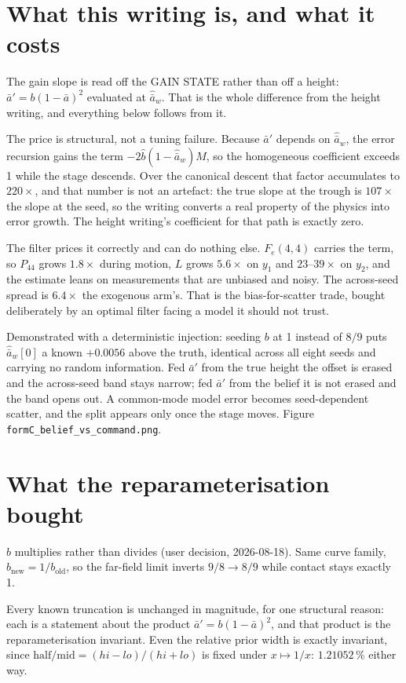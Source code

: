\documentclass[11pt,a4paper,fontset=none]{ctexart}
\newcommand{\ba}{\bar{a}}
\begin{document}
\section*{What this writing is, and what it costs}

The gain slope is read off the GAIN STATE rather than off a height:
$\ba' = b(1-\ba)^{2}$ evaluated at $\hat{\ba}_w$. That is the whole difference
from the height writing, and everything below follows from it.

The price is structural, not a tuning failure. Because $\ba'$ depends on
$\hat{\ba}_w$, the error recursion gains the term $-2\hat{b}(1-\hat{\ba}_w)M$,
so the homogeneous coefficient exceeds 1 while the stage descends. Over the
canonical descent that factor accumulates to $220\times$, and that number is not
an artefact: the true slope at the trough is $107\times$ the slope at the seed,
so the writing converts a real property of the physics into error growth. The
height writing's coefficient for that path is exactly zero.

The filter prices it correctly and can do nothing else. $F_e(4,4)$ carries the
term, so $P_{44}$ grows $1.8\times$ during motion, $L$ grows $5.6\times$ on
$y_1$ and $23$--$39\times$ on $y_2$, and the estimate leans on measurements that
are unbiased and noisy. The across-seed spread is $6.4\times$ the exogenous
arm's. That is the bias-for-scatter trade, bought deliberately by an optimal
filter facing a model it should not trust.

Demonstrated with a deterministic injection: seeding $b$ at 1 instead of $8/9$
puts $\hat{\ba}_w[0]$ a known $+0.0056$ above the truth, identical across all
eight seeds and carrying no random information. Fed $\ba'$ from the true height
the offset is erased and the across-seed band stays narrow; fed $\ba'$ from the
belief it is not erased and the band opens out. A common-mode model error
becomes seed-dependent scatter, and the split appears only once the stage moves.
Figure \texttt{formC\_belief\_vs\_command.png}.

\section*{What the reparameterisation bought}

$b$ multiplies rather than divides (user decision, 2026-08-18). Same curve
family, $b_{\mathrm{new}} = 1/b_{\mathrm{old}}$, so the far-field limit inverts
$9/8 \to 8/9$ while contact stays exactly 1.

Every known truncation is unchanged in magnitude, for one structural reason:
each is a statement about the product $\ba' = b(1-\ba)^{2}$, and that product is
the reparameterisation invariant. Even the relative prior width is exactly
invariant, since $\mathrm{half}/\mathrm{mid} = (hi-lo)/(hi+lo)$ is fixed under
$x \mapsto 1/x$: $1.21052\,\%$ either way.
\end{document}
